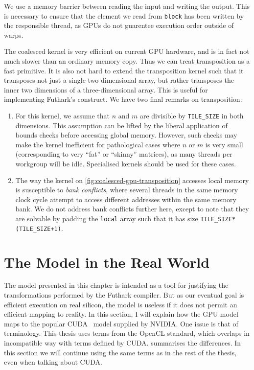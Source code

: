 \begin{table}
  \centering
\end{table}

We use a memory barrier between reading the input and writing the
output.  This is necessary to ensure that the element we read from
\texttt{block} has been written by the responsible thread, as GPUs do
not guarentee execution order outside of warps.

The coalesced kernel is very efficient on current GPU hardware, and is
in fact not much slower than an ordinary memory copy.  Thus we can
treat transposition as a fast primitive.  It is also not hard to
extend the transposition kernel such that it transposes not just a
single two-dimensional array, but rather transposes the inner two
dimensions of a three-dimensional array.  This is useful for
implementing Futhark's  construct.  We have two final
remarks on transposition:

\begin{enumerate}
\item For this kernel, we assume that $n$ and $m$ are divisible by
  \texttt{TILE\_SIZE} in both dimensions.  This assumption can be
  lifted by the liberal application of bounds checks before accessing
  global memory.  However, such checks may make the kernel inefficient
  for pathological cases where $n$ or $m$ is very small (corresponding
  to very ``fat'' or ``skinny'' matrices), as many threads per
  workgroup will be idle.  Specialised kernels should be used for
  these cases.
\item The way the kernel on \cref{fig:coalesced-gpu-transposition}
  accesses local memory is susceptible to \textit{bank conflicts},
  where several threads in the same memory clock cycle attempt to
  access different addresses within the same memory bank.  We do not
  address bank conflicts further here, except to note that they are
  solvable by padding the \texttt{local} array such that it has size
  \texttt{TILE\_SIZE*(TILE\_SIZE+1)}.
\end{enumerate}

\section{The Model in the Real World}
\label{sec:gpu-model-real-world}

The model presented in this chapter is intended as a tool for
justifying the transformations performed by the Futhark compiler.  But
as our eventual goal is efficient execution on real silicon, the model
is useless if it does not permit an efficient mapping to reality.  In
this section, I will explain how the GPU model maps to the popular
CUDA~\cite{cuda} model supplied by NVIDIA.  One issue is that of
terminology.  This thesis uses terms from the OpenCL standard, which
overlaps in incompatible way with terms defined by CUDA.
 summarises the differences.  In this section we
will continue using the same terms as in the rest of the thesis, even
when talking about CUDA.

